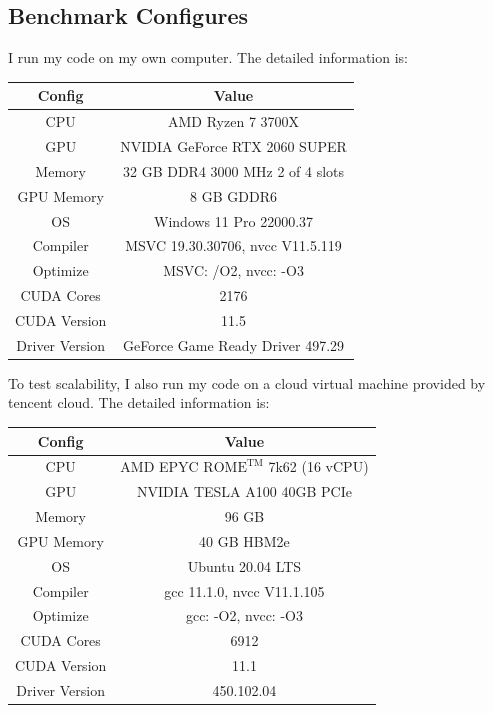 \documentclass[10pt,twocolumn,letterpaper]{article}
\begin{document}
\subsection{Benchmark Configures}

I run my code on my own computer. The detailed information is:

\begin{table}[h]
\begin{tabular}{@{}c|c@{}}
\toprule
Config   & Value                                             \\ \midrule
CPU      & AMD Ryzen 7 3700X \\
GPU     &  NVIDIA GeForce RTX 2060 SUPER \\ 
Memory   & 32 GB DDR4 3000 MHz 2 of 4 slots                                            \\
GPU Memory & 8 GB GDDR6  \\
OS       & Windows 11 Pro 22000.37                                  \\
Compiler &  MSVC 19.30.30706, nvcc V11.5.119                                  \\
Optimize & MSVC: /O2, nvcc: -O3                                              \\ 
CUDA Cores   & 2176 \\
CUDA Version & 11.5 \\
Driver Version & GeForce Game Ready Driver 497.29 \\
\bottomrule
\end{tabular}
\end{table}

To test scalability, I also run my code on a cloud virtual machine provided by tencent cloud. The detailed information is:

\begin{table}[h]
\begin{tabular}{@{}c|c@{}}
\toprule
Config   & Value                                             \\ \midrule
CPU      &  AMD EPYC $\text{ROME}^{\text{TM}}$ 7k62 (16 vCPU) \\
GPU     &  NVIDIA TESLA A100 40GB PCIe \\ 
Memory   & 96 GB                                             \\
GPU Memory & 40 GB HBM2e  \\
OS       & Ubuntu 20.04 LTS                                  \\
Compiler &  gcc 11.1.0, nvcc V11.1.105                                  \\
Optimize & gcc: -O2, nvcc: -O3                                              \\ 
CUDA Cores   & 6912 \\
CUDA Version & 11.1 \\
Driver Version & 450.102.04 \\
\bottomrule
\end{tabular}
\end{table}
\end{document}
